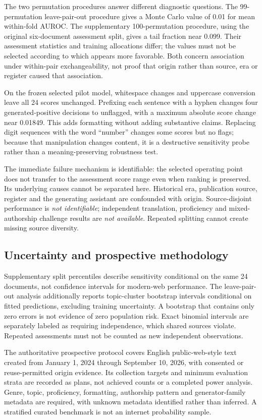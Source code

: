 The two permutation procedures answer different diagnostic questions. The
99-permutation leave-pair-out procedure gives a Monte Carlo value of 0.01 for
mean within-fold AUROC. The supplementary 100-permutation procedure, using
the original six-document assessment split, gives a tail fraction near 0.099.
Their assessment statistics and training allocations differ; the values must
not be selected according to which appears more favorable. Both concern
association under within-pair exchangeability, not proof that origin rather
than source, era or register caused that association.

On the frozen selected pilot model, whitespace changes and uppercase conversion
leave all 24 scores unchanged. Prefixing each sentence with a hyphen changes
four generated-positive decisions to unflagged, with a maximum absolute score
change near 0.01849. This adds formatting without adding substantive claims.
Replacing digit sequences with the word ``number'' changes some scores but
no flags; because that manipulation changes content, it is a destructive
sensitivity probe rather than a meaning-preserving robustness test.

The immediate failure mechanism is identifiable: the selected operating point
does not transfer to the assessment score range even when ranking is preserved.
Its underlying causes cannot be separated here. Historical era, publication
source, register and the generating assistant are confounded with origin.
Source-disjoint performance is \emph{not identifiable}; independent translation,
proficiency and mixed-authorship challenge results are \emph{not available}.
Repeated splitting cannot create missing source diversity.

\subsection{Uncertainty and prospective methodology}
Supplementary split percentiles describe sensitivity conditional on the same
24 documents, not confidence intervals for modern-web performance. The
leave-pair-out analysis additionally reports topic-cluster bootstrap intervals
conditional on fitted predictions, excluding training uncertainty. A bootstrap
that contains only zero errors is not evidence of zero population risk.
Exact binomial intervals are separately labeled as requiring independence,
which shared sources violate. Repeated assessments must not be counted as
new independent observations.

The authoritative prospective protocol covers English public-web-style text
created from January 1, 2024 through September 10, 2026, with consented or
reuse-permitted origin evidence. Its collection targets and minimum evaluation
strata are recorded as plans, not achieved counts or a completed power analysis.
Genre, topic, proficiency, formatting, authorship pattern and generator-family
metadata are required, with unknown metadata identified rather than inferred.
A stratified curated benchmark is not an internet probability sample.

